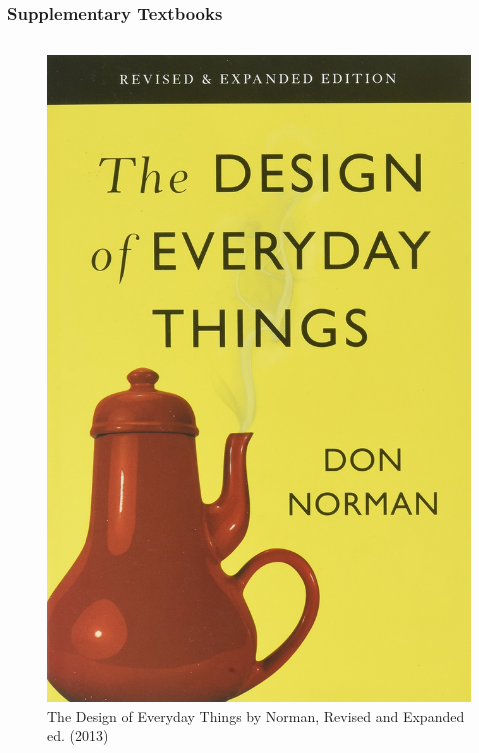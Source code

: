 \documentclass{beamer}
\begin{document}
\begin{frame}
	\frametitle{Supplementary Textbooks}
	
	\begin{columns}[t] %
		
		\captionsetup{justification=centering}
		
		
		\begin{figure}
			
			\includegraphics[width=0.8\linewidth]{norman}
			\caption{The Design of Everyday Things by Norman, Revised and Expanded ed. (2013)}
		\end{figure}
		

\end{columns}
\end{frame}
\end{document}

